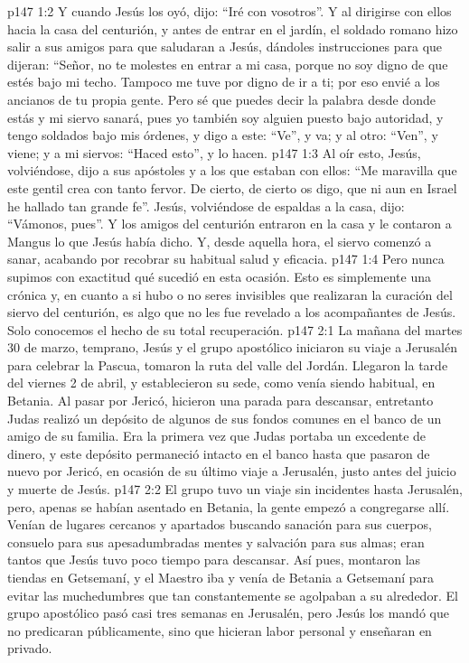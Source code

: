 \vs p147 1:2 Y cuando Jesús los oyó, dijo: “Iré con vosotros”. Y al dirigirse con ellos hacia la casa del centurión, y antes de entrar en el jardín, el soldado romano hizo salir a sus amigos para que saludaran a Jesús, dándoles instrucciones para que dijeran: “Señor, no te molestes en entrar a mi casa, porque no soy digno de que estés bajo mi techo. Tampoco me tuve por digno de ir a ti; por eso envié a los ancianos de tu propia gente. Pero sé que puedes decir la palabra desde donde estás y mi siervo sanará, pues yo también soy alguien puesto bajo autoridad, y tengo soldados bajo mis órdenes, y digo a este: “Ve”, y va; y al otro: “Ven”, y viene; y a mi siervos: “Haced esto”, y lo hacen.
\vs p147 1:3 Al oír esto, Jesús, volviéndose, dijo a sus apóstoles y a los que estaban con ellos: “Me maravilla que este gentil crea con tanto fervor. De cierto, de cierto os digo, que ni aun en Israel he hallado tan grande fe”. Jesús, volviéndose de espaldas a la casa, dijo: “Vámonos, pues”. Y los amigos del centurión entraron en la casa y le contaron a Mangus lo que Jesús había dicho. Y, desde aquella hora, el siervo comenzó a sanar, acabando por recobrar su habitual salud y eficacia.
\vs p147 1:4 Pero nunca supimos con exactitud qué sucedió en esta ocasión. Esto es simplemente una crónica y, en cuanto a si hubo o no seres invisibles que realizaran la curación del siervo del centurión, es algo que no les fue revelado a los acompañantes de Jesús. Solo conocemos el hecho de su total recuperación.
\vs p147 2:1 La mañana del martes 30 de marzo, temprano, Jesús y el grupo apostólico iniciaron su viaje a Jerusalén para celebrar la Pascua, tomaron la ruta del valle del Jordán. Llegaron la tarde del viernes 2 de abril, y establecieron su sede, como venía siendo habitual, en Betania. Al pasar por Jericó, hicieron una parada para descansar, entretanto Judas realizó un depósito de algunos de sus fondos comunes en el banco de un amigo de su familia. Era la primera vez que Judas portaba un excedente de dinero, y este depósito permaneció intacto en el banco hasta que pasaron de nuevo por Jericó, en ocasión de su último viaje a Jerusalén, justo antes del juicio y muerte de Jesús.
\vs p147 2:2 El grupo tuvo un viaje sin incidentes hasta Jerusalén, pero, apenas se habían asentado en Betania, la gente empezó a congregarse allí. Venían de lugares cercanos y apartados buscando sanación para sus cuerpos, consuelo para sus apesadumbradas mentes y salvación para sus almas; eran tantos que Jesús tuvo poco tiempo para descansar. Así pues, montaron las tiendas en Getsemaní, y el Maestro iba y venía de Betania a Getsemaní para evitar las muchedumbres que tan constantemente se agolpaban a su alrededor. El grupo apostólico pasó casi tres semanas en Jerusalén, pero Jesús los mandó que no predicaran públicamente, sino que hicieran labor personal y enseñaran en privado.
